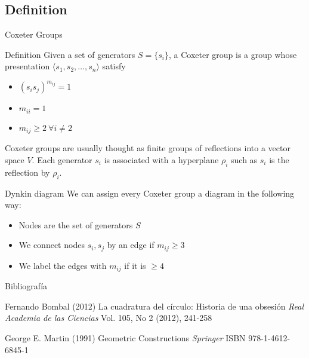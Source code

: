 \documentclass{beamer}
\begin{document}
\subsection{Definition}
\begin{frame}{Coxeter Groups}
  \begin{block}{Definition}
    Given a set of generators $S = \{s_i\}$, a Coxeter group is a group whose presentation $\langle s_1, s_2, \ldots, s_n  \rangle $ satisfy
\begin{itemize}[topsep=-6pt, itemsep=0pt]
  \item $(s_is_j)^{m_{ij}} = 1$
  \item $m_{ii} = 1$
  \item $m_{ij}\ge 2 \ \forall i\neq 2$
\end{itemize}
  \end{block}
Coxeter groups are usually thought as finite groups of reflections into a vector space $V$. Each generator $s_i$ is associated with a hyperplane $\rho_i$ such as $s_i$ is the reflection by $\rho _i$.
\begin{block}{Dynkin diagram}
 We can assign every Coxeter group a diagram in the following way:
 \begin{itemize}[topsep=-6pt, itemsep=0pt]
   \item Nodes are the set of generators $S$
   \item We connect nodes $s_i, s_j$ by an edge if $m_{ij}\ge 3$
   \item We label the edges with  $m_{ij}$ if it is $\ge 4$
 \end{itemize}
\end{block}
\end{frame}



\begin{frame}{Bibliografía}
\footnotesize{
\begin{thebibliography}{99} %
 Fernando Bombal (2012)
\newblock La cuadratura del círculo: Historia de una obsesión
\newblock \emph{Real Academia de las Ciencias} Vol. 105, No 2 (2012), 241-258
\end{thebibliography}

\begin{thebibliography}{99} %
 George E. Martin (1991)
\newblock Geometric Constructions
\newblock \emph{Springer} ISBN 978-1-4612-6845-1
\end{thebibliography}

}
\end{frame}

\end{document}
